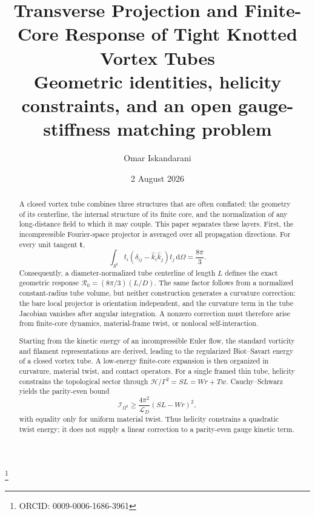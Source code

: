 \documentclass[aps,pre,preprint,notitlepage,nofootinbib,superscriptaddress]{revtex4-2}
\newcommand{\dd}{\mathrm d}
\newcommand{\calH}{\mathcal H}
\newcommand{\calL}{\mathcal L}
\newcommand{\calI}{\mathcal I}
\newcommand{\Rgeom}{\mathscr R_{0}}
\begin{document}
\title{\texorpdfstring{Transverse Projection and Finite-Core Response of Tight Knotted Vortex Tubes\\\large Geometric identities, helicity constraints, and an open gauge-stiffness matching problem}{Transverse Projection and Finite-Core Response of Tight Knotted Vortex Tubes: Geometric identities, helicity constraints, and an open gauge-stiffness matching problem}}

\author{Omar Iskandarani}
\thanks{ORCID: 0009-0006-1686-3961}
\date{2 August 2026}

\begin{abstract}
A closed vortex tube combines three structures that are often conflated: the geometry of its centerline, the internal structure of its finite core, and the normalization of any long-distance field to which it may couple.  This paper separates these layers.  First, the incompressible Fourier-space projector is averaged over all propagation directions.  For every unit tangent $\bm t$,
\[
\int_{S^2} t_i(\delta_{ij}-\widehat{k}_i\widehat{k}_j)t_j\,\dd\Omega=\frac{8\pi}{3}.
\]
Consequently, a diameter-normalized tube centerline of length $L$ defines the exact geometric response $\Rgeom=(8\pi/3)(L/D)$.  The same factor follows from a normalized constant-radius tube volume, but neither construction generates a curvature correction: the bare local projector is orientation independent, and the curvature term in the tube Jacobian vanishes after angular integration.  A nonzero correction must therefore arise from finite-core dynamics, material-frame twist, or nonlocal self-interaction.

Starting from the kinetic energy of an incompressible Euler flow, the standard vorticity and filament representations are derived, leading to the regularized Biot--Savart energy of a closed vortex tube.  A low-energy finite-core expansion is then organized in curvature, material twist, and contact operators.  For a single framed thin tube, helicity constrains the topological sector through $\calH/\Gamma^2=SL=Wr+Tw$.  Cauchy--Schwarz yields the parity-even bound
\[
\calI_{\Omega^2}\ge \frac{4\pi^2}{\calL_D}(SL-Wr)^2,
\]
with equality only for uniform material twist.  Thus helicity constrains a quadratic twist energy; it does not supply a linear correction to a parity-even gauge kinetic term.


\end{abstract}
\end{document}
